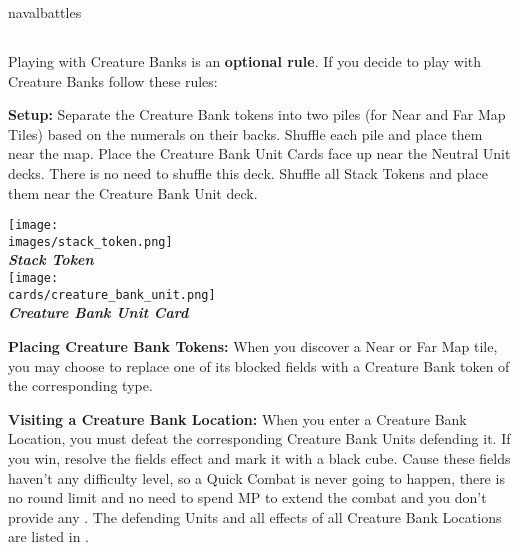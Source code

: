 \begin{expansion}[before=\vspace*{-11mm}]{navalbattles}
  \begin{multicols*}{2}
  \subsection*{}
  Playing with Creature Banks is an \textbf{optional rule}.
  If you decide to play with Creature Banks follow these rules:\par
  \vspace*{1em}
  \textbf{Setup:} Separate the Creature Bank tokens into two piles (for Near and Far Map Tiles) based on the numerals on their backs.
  Shuffle each pile and place them near the map.
  Place the Creature Bank Unit Cards face up near the Neutral Unit decks.
  There is no need to shuffle this deck.
  Shuffle all Stack Tokens and place them near the Creature Bank Unit deck.

  \bigskip
  \begin{multicols*}{2}
    \begin{center}
      \vspace*{\fill}
      \texttt{[image: \\images/stack\_token.png]}\\
      \textbf{\footnotesize\textit{\textcolor{darkcandyapplered}{Stack Token}}}\\
      \vspace*{\fill}
      \columnbreak
      \texttt{[image: \\cards/creature\_bank\_unit.png]}\\
      \textbf{\footnotesize\textit{\textcolor{darkcandyapplered}{Creature Bank Unit Card}}}
    \end{center}
  \end{multicols*}

  \textbf{Placing Creature Bank Tokens:} When you discover a Near or Far Map tile, you may choose to replace one of its blocked fields with a Creature Bank token of the corresponding type.\par
  \textbf{Visiting a Creature Bank Location:} When you enter a Creature Bank Location, you must defeat the corresponding Creature Bank Units defending it.
  If you win, resolve the fields effect and mark it with a black cube.
  Cause these fields haven't any difficulty level, so a Quick Combat is never going to happen, there is no round limit and no need to spend MP to extend the combat and you don't provide any .
  The defending Units and all effects of all Creature Bank Locations are listed in .


\end{multicols*}
\end{expansion}
